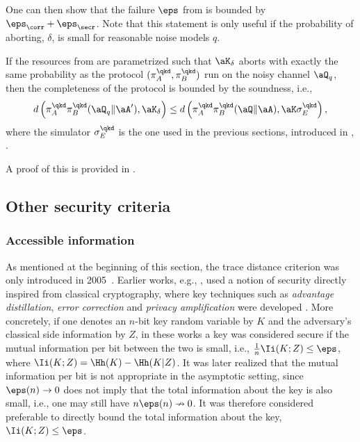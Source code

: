 One can then show that the failure $\eps$ from  is bounded by $\eps_{\corr}+\eps_{\secr}$. Note that this statement is only useful if the probability of aborting, $\delta$, is small for reasonable noise models $q$.

\begin{lem} \label{lem:robustness}
If the resources from  are parametrized such that $\aK_\delta$ aborts with exactly the same probability as the protocol $(\pi_A^{\qkd},\pi_B^{\qkd})$ run on the noisy channel $\aQ_q$, then the completeness of the protocol is bounded by the soundness, i.e.,  
\begin{equation*} d\left( \pi_A^{\qkd}\pi_B^{\qkd}(\aQ_q \| \aA')
  ,\aK_\delta\right)  \leq d\left(
  \pi_A^{\qkd}\pi_B^{\qkd}(\aQ \| \aA),\aK \sigma^{\qkd}_E\right),
\end{equation*} 
where the simulator $\sigma^{\qkd}_E$ is the one used in the previous sections, introduced in , .
\end{lem}

A proof of this is provided in .


\subsection{Other security criteria}
\label{sec:qkd.other}


\subsubsection{Accessible information}
\label{sec:qkd.other.ai}

As mentioned at the beginning of this section, the trace distance
criterion was only introduced in
2005~\cite{RK05,BHLMO05,Ren05}. Earlier works, e.g.,
\textcite{May96,BBBMR00,SP00}, used a notion of security directly
inspired from classical cryptography, where key techniques such as
\emph{advantage distillation}, \emph{error correction} and
\emph{privacy amplification} were developed
\cite{BBR88,Mau93,AC93,BBCM95}. More concretely, if one denotes an
$n$-bit key random variable by $K$ and the adversary's classical side
information by $Z$, in these works a key was considered secure if the
mutual information per bit between the two is small, i.e.,
$\frac{1}{n}\Ii(K;Z) \leq \eps$, where $\Ii(K;Z) = \Hh(K) -
\Hh(K|Z)$. It was later realized \cite{Mau94,MW00} that the mutual
information per bit is not appropriate in the asymptotic setting,
since $\eps(n) \to 0$ does not imply that the total information about
the key is also small, i.e., one may still have
$n\eps(n) \nrightarrow 0$. It was therefore considered preferable to
directly bound the total information about the key,
$\Ii(K;Z) \leq \eps$.


